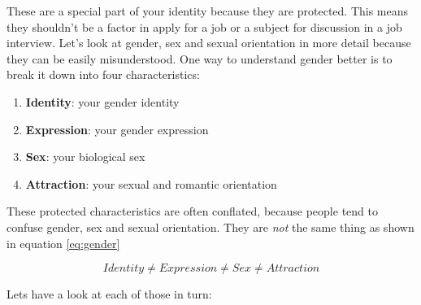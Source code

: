 \documentclass[
]{book}
\providecommand{\tightlist}{%
  \setlength{\itemsep}{0pt}\setlength{\parskip}{0pt}}
\begin{document}
These are a special part of your identity because they are protected. This means they shouldn't be a factor in apply for a job or a subject for discussion in a job interview. Let's look at gender, sex and sexual orientation in more detail because they can be easily misunderstood. One way to understand gender better is to break it down into four characteristics:

\begin{enumerate}
\def\labelenumi{\arabic{enumi}.}
\tightlist
\item
  \textbf{Identity}: your gender identity
\item
  \textbf{Expression}: your gender expression
\item
  \textbf{Sex}: your biological sex
\item
  \textbf{Attraction}: your sexual and romantic orientation
\end{enumerate}

These protected characteristics are often conflated, because people tend to confuse gender, sex and sexual orientation. They are \emph{not} the same thing as shown in equation \eqref{eq:gender}

\begin{equation}
Identity ≠ Expression ≠ Sex ≠ Attraction
  \label{eq:gender}
\end{equation}

Lets have a look at each of those in turn:
\end{document}
